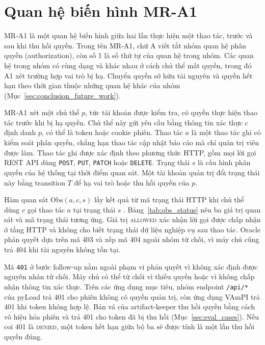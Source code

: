 \section{Quan hệ biến hình MR-A1}
\label{sec:method_mra1}

MR-A1 là một quan hệ biến hình giữa hai lần thực hiện một thao tác, trước và sau khi thu hồi quyền. Trong tên MR-A1, chữ A viết tắt nhóm quan hệ phân quyền (authorization), còn số 1 là số thứ tự của quan hệ trong nhóm. Các quan hệ trong nhóm có cùng dạng và khác nhau ở cách chủ thể mất quyền, trong đó A1 xét trường hợp vai trò bị hạ. Chuyển quyền sở hữu tài nguyên và quyền hết hạn theo thời gian thuộc những quan hệ khác của nhóm (Mục~\ref{sec:conclusion_future_work}).

MR-A1 xét một chủ thể $p$, tức tài khoản được kiểm tra, có quyền thực hiện thao tác trước khi bị hạ quyền. Chủ thể này gửi yêu cầu bằng thông tin xác thực $c$ định danh $p$, có thể là token hoặc cookie phiên. Thao tác $a$ là một thao tác ghi có kiểm soát phân quyền, chẳng hạn thao tác cập nhật báo cáo mà chỉ quản trị viên được làm. Thao tác ghi được xác định theo phương thức HTTP, gồm mọi lời gọi REST API dùng \texttt{POST}, \texttt{PUT}, \texttt{PATCH} hoặc \texttt{DELETE}. Trạng thái $s$ là cấu hình phân quyền của hệ thống tại thời điểm quan sát. Một tài khoản quản trị đổi trạng thái này bằng transition $T$ để hạ vai trò hoặc thu hồi quyền của $p$.

Hàm quan sát $\mathrm{Obs}(a, c, s)$ lấy kết quả từ mã trạng thái HTTP khi chủ thể dùng $c$ gọi thao tác $a$ tại trạng thái $s$ \cite{rfc9110}. Bảng~\ref{tab:obs_status} nêu ba giá trị quan sát và mã trạng thái tương ứng. Giá trị \textsc{allowed} xác nhận lời gọi được chấp nhận ở tầng HTTP và không cho biết trạng thái dữ liệu nghiệp vụ sau thao tác. Oracle phán quyết dựa trên mã 403 và xếp mã 404 ngoài nhóm từ chối, vì máy chủ cũng trả 404 khi tài nguyên không tồn tại.

Mã \texttt{401} ở bước follow-up nằm ngoài phạm vi phán quyết vì không xác định được nguyên nhân từ chối. Máy chủ có thể từ chối vì thiếu quyền hoặc vì không chấp nhận thông tin xác thực. Trên các ứng dụng mục tiêu, nhóm endpoint \texttt{/api/*} của pyLoad trả 401 cho phiên không có quyền quản trị, còn ứng dụng VAmPI trả 401 khi token không hợp lệ. Bản vá của artifact-keeper thu hồi quyền bằng cách vô hiệu hóa phiên và trả 401 cho token đã bị thu hồi (Mục~\ref{sec:eval_cases}). Nếu coi 401 là \textsc{denied}, một token hết hạn giữa bộ ba sẽ được tính là một lần thu hồi quyền đúng.

